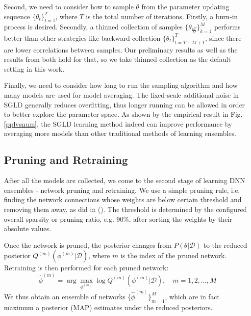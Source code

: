 \documentclass{article} %
\begin{document}
Second, we need to consider how to sample $ \theta $ from the parameter updating sequence  $ \{\theta_t\}_{t=1}^T $, where $ T $ is the total number of iterations. Firstly, a burn-in process is desired. Secondly, a thinned collection of samples $ \{\theta_{\frac{kT}{M}}\}_{k=1}^M $ performs better than other strategies like backward collection $ \{\theta_t\}_{t=T-M+1}^T $, since there are lower correlations between samples. Our preliminary results as well as the results from \citet{gan2016scalable} both hold for that, so we take thinned collection as the default setting in this work. 

Finally, we need to consider how long to run the sampling algorithm and how many models are used for model averaging. The fixed-scale additional noise in SGLD generally reduces overfitting, thus longer running can be allowed in order to better explore the parameter space. As shown by the empirical result in Fig. \ref{pplvsnum}, the SGLD learning method indeed can improve performance by averaging more models than other traditional  methods of learning ensembles.

\subsection{Pruning and Retraining}
\label{PR}
After all the models are collected, we come to the second stage of learning DNN ensembles - network pruning and retraining. We use a simple pruning rule, i.e. finding the network connections whose weights are below certain threshold and removing them away, as did in (\citet{han2015learning}).
The threshold is determined by the configured overall sparsity or pruning ratio, e.g. 90\%, after sorting the weights by their absolute values.

Once the network is pruned, the posterior changes from 
$ P(\theta|\mathcal{D}) $ to the reduced posterior 
$ Q^{(m)}(\phi^{(m)}|\mathcal{D}) $, where $ m $ is the index of the pruned network. Retraining is then performed for each pruned network:
\begin{equation}
\label{eq4}
\hat{\phi}^{(m)} = \arg \max_{\phi^{(m)}} \log
Q^{(m)}(\phi^{(m)}|\mathcal{D}), \quad m=1,2,\ldots,M
\end{equation}
We thus obtain an ensemble of networks $ \{\hat{\phi}^{(m)}\}_{m=1}^M $, which are in fact maximum a posterior (MAP) estimates under the reduced posteriors.
\end{document}
